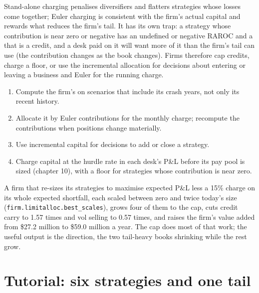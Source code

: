 Stand-alone charging penalises diversifiers and flatters strategies whose losses come together; Euler charging is consistent with the firm's actual
capital and rewards what reduces the firm's tail. It has its own trap: a strategy whose contribution is near zero or negative has an undefined or
negative RAROC and a  that is a credit, and a desk paid on it will want more of it than the firm's tail can use (the contribution
changes as the book changes). Firms therefore cap credits, charge a floor, or use the incremental allocation for decisions about entering or
leaving a business and Euler for the running charge.

\begin{method}\label{met:fm:limits-and-capital-allocation:charge}
\begin{enumerate}
\item Compute the firm's  on scenarios that include its crash years, not only its recent history.
\item Allocate it by Euler contributions for the monthly charge; recompute the contributions when positions change materially.
\item Use incremental capital for decisions to add or close a strategy.
\item Charge capital at the hurdle rate in each desk's P\&L before its pay pool is sized (chapter 10), with a floor for strategies whose
contribution is near zero.
\end{enumerate}
\end{method}

A firm that re-sizes its strategies to maximise expected P\&L less a 15\% charge on its whole expected shortfall, each scaled between zero and
twice today's size (\texttt{firm.limitalloc.best\_scales}), grows four of them to the cap, cuts credit carry to 1.57 times and vol selling to
0.57 times, and raises the firm's value added from \$27.2 million to \$59.0 million a year. The cap does most of that work; the useful output is
the direction, the two tail-heavy books shrinking while the rest grow.

\section{Tutorial: six strategies and one tail}\label{tut:fm:limits-and-capital-allocation:tut}

